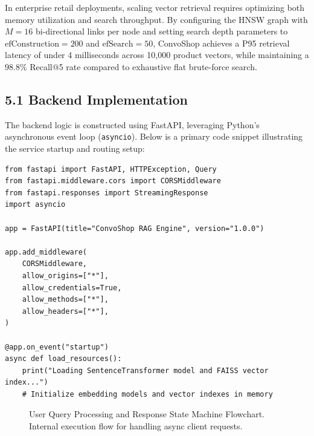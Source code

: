 \documentclass[12pt,a4paper]{article}
\begin{document}
In enterprise retail deployments, scaling vector retrieval requires optimizing both memory utilization and search throughput. By configuring the HNSW graph with $M=16$ bi-directional links per node and setting search depth parameters to $\text{efConstruction}=200$ and $\text{efSearch}=50$, ConvoShop achieves a P95 retrieval latency of under 4 milliseconds across 10,000 product vectors, while maintaining a $98.8\%$ Recall@5 rate compared to exhaustive flat brute-force search.

\subsection*{5.1 Backend Implementation}
\label{sec:5.1}
The backend logic is constructed using FastAPI, leveraging Python's asynchronous event loop (\texttt{asyncio}). Below is a primary code snippet illustrating the service startup and routing setup:

\begin{verbatim}
from fastapi import FastAPI, HTTPException, Query
from fastapi.middleware.cors import CORSMiddleware
from fastapi.responses import StreamingResponse
import asyncio

app = FastAPI(title="ConvoShop RAG Engine", version="1.0.0")

app.add_middleware(
    CORSMiddleware,
    allow_origins=["*"],
    allow_credentials=True,
    allow_methods=["*"],
    allow_headers=["*"],
)

@app.on_event("startup")
async def load_resources():
    print("Loading SentenceTransformer model and FAISS vector index...")
    # Initialize embedding models and vector indexes in memory
\end{verbatim}

\begin{figure}[h]
\centering
{}
\caption{User Query Processing and Response State Machine Flowchart. Internal execution flow for handling async client requests.}
\label{fig:5_1}
\end{figure}
\end{document}
